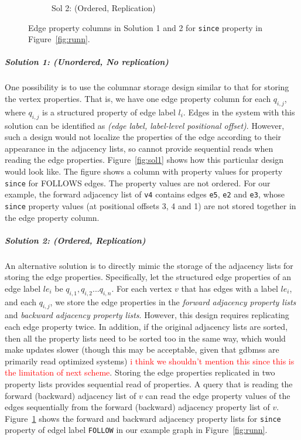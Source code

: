 \begin{figure}
\begin{subfigure}{0.55\textwidth}
		\captionsetup{justification=centering}
		\caption{Sol 2: (Ordered, Replication)}
		\label{fig:sol2}
	\end{subfigure}
	\captionsetup{justification=centering}
	\vspace{5pt}
	\caption{Edge property columns in Solution 1 and 2 for \texttt{since} property in Figure~\ref{fig:runn}.}
	\vspace{-10pt}
	\label{fig:sol1and2}
\end{figure}

\vspace{-12pt}
\subparagraph{Solution 1: (Unordered, No replication)}One possibility is to use the columnar storage design similar to that for storing the vertex properties. That is, we have one edge property column for each $q_{i,j}$, where $q_{i,j}$ is a structured property of edge label $l_i$. Edges in the system with this solution can be identified as \emph{(edge label, label-level positional offset)}. However, such a design would not localize the properties of the edge according to their appearance in the adjacency lists, so cannot provide sequential reads when reading the edge properties. Figure~\ref{fig:sol1} shows how this particular design would look like. The figure shows a column with property values for property \texttt{since} for FOLLOWS edges. The property values are not ordered. For our example, the forward adjacency list of \texttt{v4} contains edges \texttt{e5}, \texttt{e2} and \texttt{e3}, whose \texttt{since} property values (at positional offsets 3, 4 and 1) are not stored together in the edge property column. 

\vspace{-12pt}

\subparagraph{Solution 2: (Ordered, Replication)}An alternative solution is to directly mimic the storage of the adjacency lists for storing the edge properties. Specifically, let the structured edge properties of an edge label $le_i$ be $q_{i,1}, q_{i,2} ... q_{i,n}$. For each vertex $v$ that has edges with a label $le_i$, and each $q_{i,j}$, we store the edge properties in the \emph{forward adjacency property lists} and \emph{backward adjacency property lists}. However, this design requires replicating each edge property twice. In addition, if the original adjacency lists are sorted, then all the property lists need to be sorted too in the same way, which would make updates slower (though this may be acceptable, given that \gls{gdbms}s are primarily read optimized systems) \textcolor{red}{i think we shouldn't mention this since this is the limitation of next scheme}. Storing the edge properties replicated in two property lists provides sequential read of properties. A query that is reading the forward (backward) adjacency list of $v$ can read the edge property values of the edges sequentially from the forward (backward) adjacency property list of $v$. Figure~\ref{fig:sol2} shows the forward and backward adjacency property lists for \texttt{since} property of edgel label \texttt{FOLLOW} in our example graph in Figure~\ref{fig:runn}.

